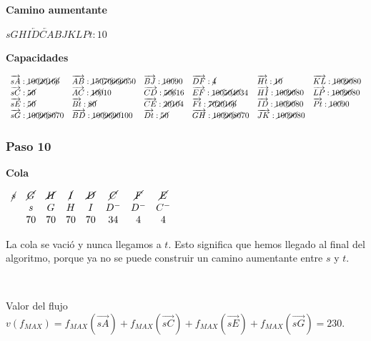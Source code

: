 \documentclass[10pt,a4paper]{article}
\begin{document}
\textbf{Camino aumentante}

\textbf{$sGHI\overleftarrow{D}\overleftarrow{CA}BJKLPt:10$}

\textbf{Capacidades}

$\begin{array}{llllll} \overrightarrow{sA}: \cancel{100}\cancel{20}\cancel{16}\cancel{6}& \overrightarrow{AB}: \cancel{150} \cancel{70}\cancel{66}\cancel{60}50&\overrightarrow{BJ}: \cancel{100}90& \overrightarrow{DF}: \cancel{4}&\overrightarrow{Ht}: \cancel{10}&\overrightarrow{KL}: \cancel{100}\cancel{90}80\\ \overrightarrow{sC}: \cancel{50}& \overrightarrow{AC}: \cancel{10}\cancel{0}10&\overrightarrow{CD}: \cancel{50}\cancel{6}16&\overrightarrow{EF}: \cancel{100}\cancel{50}\cancel{40}34&\overrightarrow{HI}: \cancel{100}\cancel{90}80&\overrightarrow{LP}: \cancel{100}\cancel{90}80\\ \overrightarrow{sE}: \cancel{50}& \overrightarrow{Bt}: \cancel{80}&\overrightarrow{CE}: \cancel{20}\cancel{10}4 &\overrightarrow{Ft}: \cancel{70}\cancel{20}\cancel{16}\cancel{6}&\overrightarrow{ID}: \cancel{100}\cancel{90}80&\overrightarrow{Pt}: \cancel{100}90\\ \overrightarrow{sG}: \cancel{100}\cancel{90}\cancel{80}70& \overrightarrow{BD}: \cancel{100}\cancel{96}\cancel{90}100&\overrightarrow{Dt}: \cancel{50}&\overrightarrow{GH}: \cancel{100}\cancel{90}\cancel{80}70&\overrightarrow{JK}: \cancel{100}\cancel{90}80&\\ \end{array}$

\subsubsection*{Paso 10}

\textbf{Cola}

\textbf{$\begin{array}{cccccccc} \cancel{s} & \cancel{G} & \cancel{H} & \cancel{I} & \cancel{D} & \cancel{C} & \cancel{F} & \cancel{E}\\ & s & G & H & I & D^- & D^- & C^- \\ & 70 & 70 & 70 & 70 & 34 & 4 & 4 \end{array}$}

La cola se vació y nunca llegamos a $t$. Esto significa que hemos llegado al final del algoritmo, porque ya no se puede construir un camino aumentante entre $s$ y $t$.

 

Valor del flujo $v(f_{MAX}) = f_{MAX} (\overrightarrow{sA}) + f_{MAX} (\overrightarrow{sC}) + f_{MAX} (\overrightarrow{sE}) + f_{MAX} (\overrightarrow{sG}) = 230$.
\end{document}
